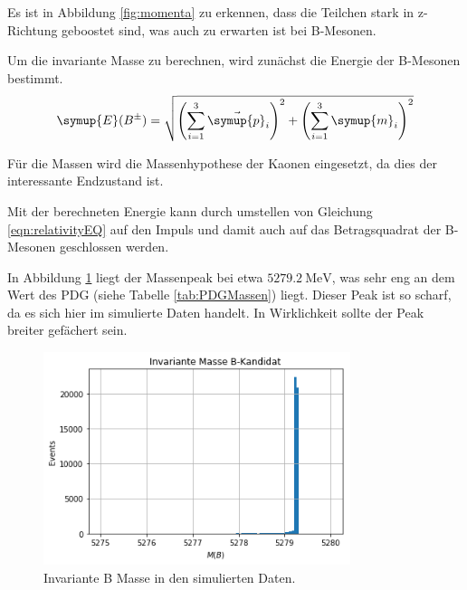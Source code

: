 Es ist in Abbildung \ref{fig:momenta} zu erkennen, dass die Teilchen stark in z-Richtung geboostet sind, was auch zu erwarten ist bei B-Mesonen.

Um die invariante Masse zu berechnen, wird zun\"achst die Energie der B-Mesonen bestimmt.
\begin{equation}
  \symup{E}(B^{\pm}) =
  \sqrt{\left(\sum_{i = 1}^{3} \vec{\symup{p}}_i\right)^2 + \left(\sum_{i = 1}^{3} \symup{m}_i\right)^2}
\end{equation}

F\"ur die Massen wird die Massenhypothese der Kaonen eingesetzt, da dies der interessante Endzustand ist.

Mit der berechneten Energie kann durch umstellen von Gleichung \eqref{eqn:relativityEQ} auf den Impuls und damit auch auf das Betragsquadrat der B-Mesonen geschlossen werden.

In Abbildung \ref{fig:invMassB} liegt der Massenpeak bei etwa $\SI{5279.2}{\mega\electronvolt}$, was sehr eng an dem Wert des PDG (siehe Tabelle \ref{tab:PDGMassen}) liegt.
Dieser Peak ist so scharf, da es sich hier im simulierte Daten handelt. In Wirklichkeit sollte der Peak breiter gefächert sein.

\begin{figure}[!htb]
  \centering
  \includegraphics[width=0.8\textwidth]{plots/sim_inv_masse_B.png}
  \caption{Invariante B Masse in den simulierten Daten.}
  \label{fig:invMassB}
\end{figure}

